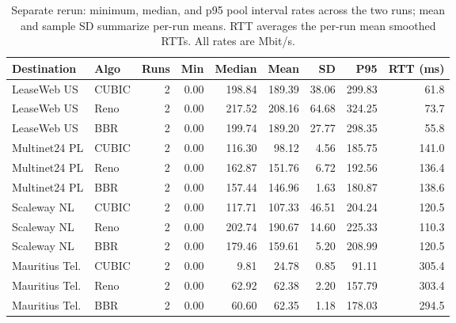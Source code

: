\begin{table}[!htbp]
\centering
\footnotesize
\setlength{\tabcolsep}{3pt}
\caption{Separate rerun: minimum, median, and p95 pool interval rates across the two runs; mean and sample SD summarize per-run means. RTT averages the per-run mean smoothed RTTs. All rates are Mbit/s.}
\begin{tabular}{@{}llrrrrrrr@{}}
\toprule
Destination & Algo & Runs & Min & Median & Mean & SD & P95 & RTT (ms) \\
\midrule
LeaseWeb US & CUBIC & 2 & 0.00 & 198.84 & 189.39 & 38.06 & 299.83 & 61.8 \\
LeaseWeb US & Reno & 2 & 0.00 & 217.52 & 208.16 & 64.68 & 324.25 & 73.7 \\
LeaseWeb US & BBR & 2 & 0.00 & 199.74 & 189.20 & 27.77 & 298.35 & 55.8 \\
Multinet24 PL & CUBIC & 2 & 0.00 & 116.30 & 98.12 & 4.56 & 185.75 & 141.0 \\
Multinet24 PL & Reno & 2 & 0.00 & 162.87 & 151.76 & 6.72 & 192.56 & 136.4 \\
Multinet24 PL & BBR & 2 & 0.00 & 157.44 & 146.96 & 1.63 & 180.87 & 138.6 \\
Scaleway NL & CUBIC & 2 & 0.00 & 117.71 & 107.33 & 46.51 & 204.24 & 120.5 \\
Scaleway NL & Reno & 2 & 0.00 & 202.74 & 190.67 & 14.60 & 225.33 & 110.3 \\
Scaleway NL & BBR & 2 & 0.00 & 179.46 & 159.61 & 5.20 & 208.99 & 120.5 \\
Mauritius Tel. & CUBIC & 2 & 0.00 & 9.81 & 24.78 & 0.85 & 91.11 & 305.4 \\
Mauritius Tel. & Reno & 2 & 0.00 & 62.92 & 62.38 & 2.20 & 157.79 & 303.4 \\
Mauritius Tel. & BBR & 2 & 0.00 & 60.60 & 62.35 & 1.18 & 178.03 & 294.5 \\
\bottomrule
\end{tabular}
\end{table}

